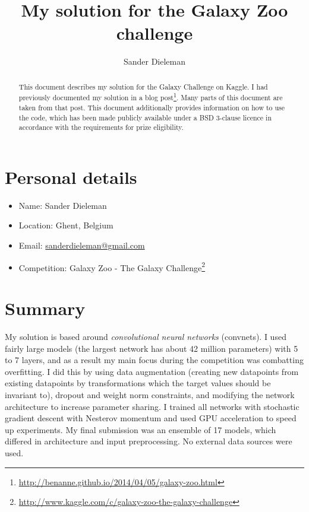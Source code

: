 \documentclass[a4paper,10pt]{article}
\title{My solution for the Galaxy Zoo challenge}
\author{Sander Dieleman}
\begin{document}
\maketitle

\begin{abstract}
This document describes my solution for the Galaxy Challenge on Kaggle. I had previously documented my solution in a blog post\footnote{\url{http://benanne.github.io/2014/04/05/galaxy-zoo.html}}. Many parts of this document are taken from that post. This document additionally provides information on how to use the code, which has been made publicly available under a BSD 3-clause licence in accordance with the requirements for prize eligibility.
\end{abstract}

\section*{Personal details}

\begin{itemize}
 \item{Name:} Sander Dieleman
 \item{Location:} Ghent, Belgium
 \item{Email:} \href{mailto:sanderdieleman@gmail.com}{sanderdieleman@gmail.com}
 \item{Competition:} Galaxy Zoo - The Galaxy Challenge\footnote{\url{http://www.kaggle.com/c/galaxy-zoo-the-galaxy-challenge}}
\end{itemize}

\tableofcontents

\section{Summary}

My solution is based around \textit{convolutional neural networks} (convnets). I used fairly large models (the largest network has about 42 million parameters) with 5 to 7 layers, and as a result my main focus during the competition was combatting overfitting. I did this by using data augmentation (creating new datapoints from existing datapoints by transformations which the target values should be invariant to), dropout and weight norm constraints, and modifying the network architecture to increase parameter sharing. I trained all networks with stochastic gradient descent with Nesterov momentum and used GPU acceleration to speed up experiments. My final submission was an ensemble of 17 models, which differed in architecture and input preprocessing. No external data sources were used.
\end{document}
